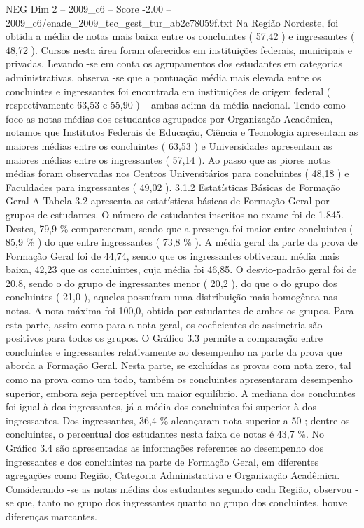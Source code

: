 \begin{textsample}{NEG Dim 2 – 2009\_c6 – Score -2.00 – 2009\_c6/enade\_2009\_tec\_gest\_tur\_ab2c78059f.txt}
Na Região Nordeste, foi obtida a média de notas mais baixa entre os concluintes ( 57,42 ) e ingressantes ( 48,72 ).
Cursos nesta área foram oferecidos em instituições federais, municipais e privadas.
Levando -se em conta os agrupamentos dos estudantes em categorias administrativas, observa -se que a pontuação média mais elevada entre os concluintes e ingressantes foi encontrada em instituições de origem federal ( respectivamente 63,53 e 55,90 ) – ambas acima da média nacional.
Tendo como foco as notas médias dos estudantes agrupados por Organização Acadêmica, notamos que Institutos Federais de Educação, Ciência e Tecnologia apresentam as maiores médias entre os concluintes ( 63,53 ) e Universidades apresentam as maiores médias entre os ingressantes ( 57,14 ).
Ao passo que as piores notas médias foram observadas nos Centros Universitários para concluintes ( 48,18 ) e Faculdades para ingressantes ( 49,02 ). 3.1.2 Estatísticas Básicas de Formação Geral A Tabela 3.2 apresenta as estatísticas básicas de Formação Geral por grupos de estudantes.
O número de estudantes inscritos no exame foi de 1.845.
Destes, 79,9 \% compareceram, sendo que a presença foi maior entre concluintes ( 85,9 \% ) do que entre ingressantes ( 73,8 \% ).
A média geral da parte da prova de Formação Geral foi de 44,74, sendo que os ingressantes obtiveram média mais baixa, 42,23 que os concluintes, cuja média foi 46,85.
O desvio-padrão geral foi de 20,8, sendo o do grupo de ingressantes menor ( 20,2 ), do que o do grupo dos concluintes ( 21,0 ), aqueles possuíram uma distribuição mais homogênea nas notas.
A nota máxima foi 100,0, obtida por estudantes de ambos os grupos.
Para esta parte, assim como para a nota geral, os coeficientes de assimetria são positivos para todos os grupos.
O Gráfico 3.3 permite a comparação entre concluintes e ingressantes relativamente ao desempenho na parte da prova que aborda a Formação Geral.
Nesta parte, se excluídas as provas com nota zero, tal como na prova como um todo, também os concluintes apresentaram desempenho superior, embora seja perceptível um maior equilíbrio.
A mediana dos concluintes foi igual à dos ingressantes, já a média dos concluintes foi superior à dos ingressantes.
Dos ingressantes, 36,4 \% alcançaram nota superior a 50 ; dentre os concluintes, o percentual dos estudantes nesta faixa de notas é 43,7 \%.
No Gráfico 3.4 são apresentadas as informações referentes ao desempenho dos ingressantes e dos concluintes na parte de Formação Geral, em diferentes agregações como Região, Categoria Administrativa e Organização Acadêmica.
Considerando -se as notas médias dos estudantes segundo cada Região, observou -se que, tanto no grupo dos ingressantes quanto no grupo dos concluintes, houve diferenças marcantes.

\end{textsample}
